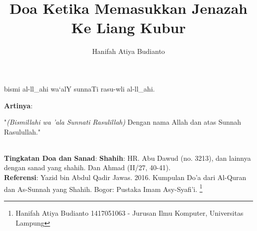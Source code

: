 \documentclass[a4paper,12pt]{article}
\title{\Large Doa Ketika Memasukkan Jenazah Ke Liang Kubur}
\author{\calligra Hanifah Atiya Budianto}
\begin{document}
\sffamily
\maketitle 
\fullvocalize
{}
\begin{arabtext}
\noindent
bismi al-ll_ahi wa`alY sunnaTi rasu-wli al-ll_ahi.\\
\end{arabtext}
\noindent
\textbf{Artinya}:
\par
\indent
"\textit{(Bismillahi wa 'ala Sunnati Rasulillah)} Dengan nama Allah dan 
atas Sunnah Rasulullah."\\\\
\par
\noindent
\textbf{Tingkatan Doa dan Sanad}: \textbf{Shahih}: HR. Abu Dawud (no. 
3213), dan lainnya dengan sanad yang shahih. Dan Ahmad (II/27, 40-41).\\
\textbf{Referensi}: Yazid bin Abdul Qadir Jawas. 2016. Kumpulan Do'a dari
Al-Quran dan As-Sunnah yang Shahih. Bogor: Pustaka Imam Asy-Syafi'i.
\footnote{Hanifah Atiya Budianto 1417051063 - Jurusan Ilmu Komputer,
Universitas Lampung}
\end{document}
